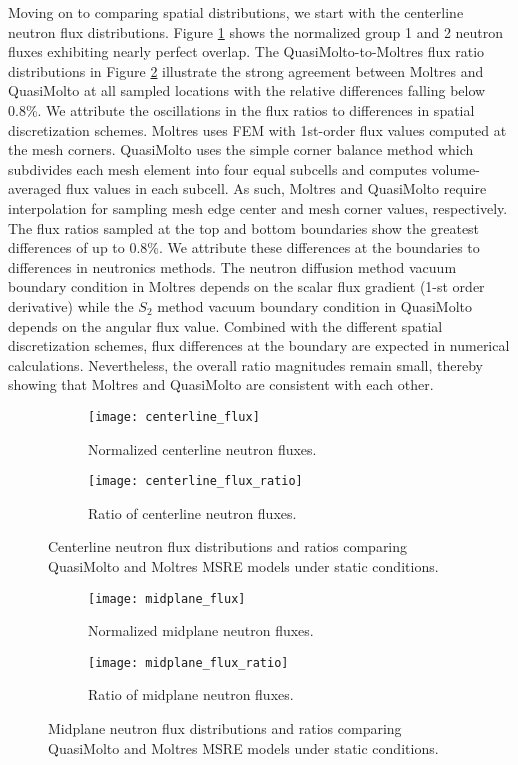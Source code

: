 Moving on to comparing spatial distributions, we start with the centerline neutron flux
distributions. Figure \ref{fig:centerline-flux-dist} shows the normalized group 1 and 2 neutron
fluxes exhibiting nearly perfect overlap. The QuasiMolto-to-Moltres flux ratio distributions in
Figure \ref{fig:centerline-flux-ratio} illustrate the strong agreement between Moltres and
QuasiMolto at all sampled locations with the relative differences falling below 0.8\%. We attribute
the oscillations in the flux ratios to differences in spatial discretization schemes. Moltres
uses \gls{FEM} with 1st-order flux values computed at the mesh corners. QuasiMolto uses
the simple corner balance method which subdivides each mesh element into four equal subcells and
computes volume-averaged flux values in each subcell. As such, Moltres and QuasiMolto require
interpolation for sampling mesh edge center and mesh corner values, respectively. The flux ratios
sampled at the top and bottom boundaries show the greatest differences of up to 0.8\%. We attribute
these differences at the boundaries to differences in neutronics methods. The neutron diffusion
method vacuum boundary condition in Moltres depends on the scalar flux gradient (1-st
order derivative) while the $S_2$ method vacuum boundary condition in QuasiMolto depends on the
angular flux value. Combined with the different spatial discretization schemes, flux differences at
the boundary are expected in numerical calculations. Nevertheless, the overall ratio magnitudes
remain small, thereby showing that Moltres and QuasiMolto are consistent with each other.

\begin{figure}[h]
  \centering
  \begin{subfigure}[b]{0.48\columnwidth}
    \centering
    \texttt{[image: centerline\_flux]}
    \caption{Normalized centerline neutron fluxes.}
    \label{fig:centerline-flux-dist}
  \end{subfigure}
  \hfill
  \begin{subfigure}[b]{0.48\columnwidth}
    \centering
    \texttt{[image: centerline\_flux\_ratio]}
    \caption{Ratio of centerline neutron fluxes.}
    \label{fig:centerline-flux-ratio}
  \end{subfigure}
  \caption{Centerline neutron flux distributions and ratios comparing QuasiMolto and Moltres
  \gls{MSRE} models under static conditions.}
  \label{fig:centerline-flux}
  \begin{subfigure}[b]{0.48\columnwidth}
    \centering
    \texttt{[image: midplane\_flux]}
    \caption{Normalized midplane neutron fluxes.}
    \label{fig:midplane-flux-dist}
  \end{subfigure}
  \hfill
  \begin{subfigure}[b]{0.48\columnwidth}
    \centering
    \texttt{[image: midplane\_flux\_ratio]}
    \caption{Ratio of midplane neutron fluxes.}
    \label{fig:midplane-flux-ratio}
  \end{subfigure}
  \caption{Midplane neutron flux distributions and ratios comparing QuasiMolto and Moltres
  \gls{MSRE} models under static conditions.}
  \label{fig:midplane-flux}
\end{figure}

